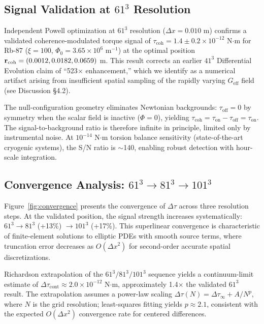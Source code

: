 \documentclass[10pt,twocolumn]{article}
\begin{document}
\subsection{Signal Validation at $61^3$ Resolution}

Independent Powell optimization at $61^3$ resolution ($\Delta x = 0.010$ m) confirms a validated coherence-modulated torque signal of $\tau_{\text{coh}} = 1.4 \pm 0.2 \times 10^{-12}$ N$\cdot$m for Rb-87 ($\xi = 100$, $\Phi_0 = 3.65 \times 10^6$ m$^{-1}$) at the optimal position ${\bf r}_{\text{coh}} = (0.0012, 0.0182, 0.0659)$ m. This result corrects an earlier $41^3$ Differential Evolution claim of ``523$\times$ enhancement,'' which we identify as a numerical artifact arising from insufficient spatial sampling of the rapidly varying $G_{\text{eff}}$ field (see Discussion \S4.2).

The null-configuration geometry eliminates Newtonian backgrounds: $\tau_{\text{off}} = 0$ by symmetry when the scalar field is inactive ($\Phi = 0$), yielding $\tau_{\text{coh}} = \tau_{\text{on}} - \tau_{\text{off}} = \tau_{\text{on}}$. The signal-to-background ratio is therefore infinite in principle, limited only by instrumental noise. At $10^{-14}$ N$\cdot$m torsion balance sensitivity (state-of-the-art cryogenic systems), the S/N ratio is $\sim$140, enabling robust detection with hour-scale integration.

\subsection{Convergence Analysis: $61^3 \rightarrow 81^3 \rightarrow 101^3$}

Figure~\ref{fig:convergence} presents the convergence of $\Delta\tau$ across three resolution steps. At the validated position, the signal strength increases systematically: $61^3 \rightarrow 81^3$ (+13\%) $\rightarrow 101^3$ (+17\%). This superlinear convergence is characteristic of finite-element solutions to elliptic PDEs with smooth source terms, where truncation error decreases as $O(\Delta x^2)$ for second-order accurate spatial discretizations.

Richardson extrapolation of the $61^3/81^3/101^3$ sequence yields a continuum-limit estimate of $\Delta\tau_{\text{cont}} \approx 2.0 \times 10^{-12}$ N$\cdot$m, approximately 1.4$\times$ the validated $61^3$ result. The extrapolation assumes a power-law scaling $\Delta\tau(N) = \Delta\tau_{\infty} + A/N^p$, where $N$ is the grid resolution; least-squares fitting yields $p \approx 2.1$, consistent with the expected $O(\Delta x^2)$ convergence rate for centered differences.
\end{document}
